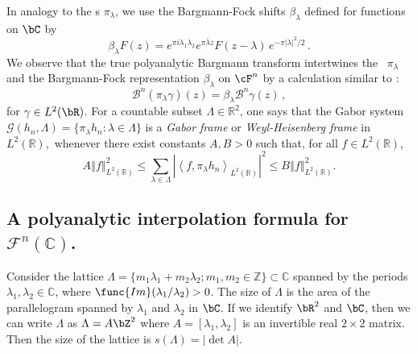 \documentclass[12pt]{amsart}
\theoremstyle{plain}
\numberwithin{equation}{section}
\begin{document}
In analogy to the \tfs s $\pi _{\lambda }$, we use the Bargmann-Fock shifts $%
\beta _{\lambda }$ defined for functions on $\bC$ by 
\begin{equation*}
\beta _{\lambda }F(z)=e^{\pi i\lambda _{1}\lambda _{2}}e^{\pi \bar{\lambda}%
z}F(z-\lambda )\,e^{-\pi |\lambda |^{2}/2}\,.
\end{equation*}%
We observe that the true polyanalytic Bargmann transform intertwines the \tfs%
\ $\pi _{\lambda }$ and the Bargmann-Fock representation $\beta _{\lambda }$
on $\cF^{n}$ by a calculation similar to \cite[p.~185]{Charly}:%
\begin{equation}
\mathcal{B}^{n}\left( \pi _{\lambda }\gamma \right) (z)=\beta _{\lambda }%
\mathcal{B}^{n}\gamma (z)\,,  \label{intertwining}
\end{equation}%
for $\gamma \in L^{2}(\bR)$. For a countable subset $\Lambda \in 
\mathbb{R}
^{2}$, one says that the Gabor system $\mathcal{G}\left( h_{n},\Lambda
\right) =\{\pi _{\lambda }h_{n}:\lambda \in \Lambda \}$ is a \emph{Gabor
frame} or \emph{Weyl-Heisenberg frame }in $L^{2}(%
\mathbb{R}
)$,\emph{\ }whenever there exist constants $A,B>0$ such that, for all $f\in
L^{2}(%
\mathbb{R}
)$,%
\begin{equation}
A\left\Vert f\right\Vert _{L^{2}(%
\mathbb{R}
)}^{2}\leq \sum_{\lambda \in \Lambda }\left\vert \left\langle f,\pi
_{\lambda }h_{n}\right\rangle _{L^{2}(%
\mathbb{R}
)}\right\vert ^{2}\leq B\left\Vert f\right\Vert _{L^{2}(%
\mathbb{R}
)}^{2}.  \label{frame}
\end{equation}

\subsection{A polyanalytic interpolation formula for $\mathcal{F}^{n}(%
\mathbb{C}
)$.}

Consider the lattice $\Lambda =\{m_{1}\lambda _{1}+m_{2}\lambda
_{2};m_{1},m_{2}\in 
\mathbb{Z}
\}\subset 
\mathbb{C}
$ spanned by the periods $\lambda _{1},\lambda _{2}\in 
\mathbb{C}
$, where $\func{Im}(\lambda _{1}/\lambda _{2})>0$. The size of $\Lambda $ is
the area of the parallelogram spanned by $\lambda _1$ and $\lambda _2$ in $%
\bC $. If we identify $\bR ^2$ and $\bC$, then we can write $\Lambda $ as $%
\Lambda = A\bZ ^2$ where $A=[\lambda _{1},\lambda _{2}]$ is an invertible
real $2\times 2$ matrix. Then the size of the lattice is $s(\Lambda )=| \det
A |$.
\end{document}
